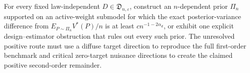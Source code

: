 For every fixed law-independent \(D\in\mathfrak D_{n,\varepsilon}\), construct an \(n\)-dependent prior \(\Pi_n\) supported on an active-weight submodel for which the exact posterior-variance difference from \(E_{P\sim\Pi_n}V^*(P)/n\) is at least \(c n^{-1-2\alpha_d}\), or exhibit one explicit design--estimator obstruction that rules out every such prior.  The unresolved positive route must use a diffuse target direction to reproduce the full first-order benchmark and critical zero-target nuisance directions to create the claimed positive second-order remainder.
